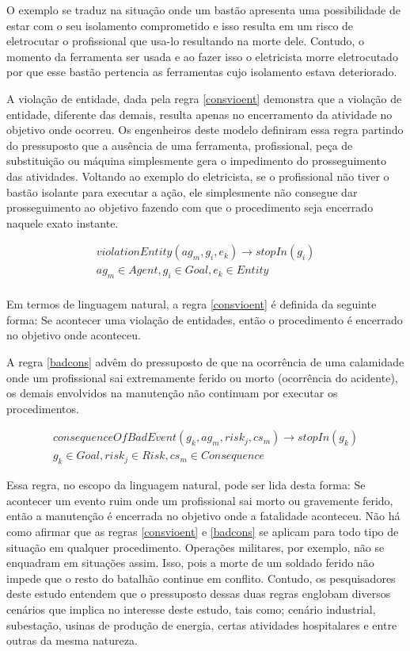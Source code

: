 O exemplo se traduz na situação onde um bastão apresenta uma possibilidade de estar com o seu isolamento comprometido e isso resulta em um risco de eletrocutar o profissional que usa-lo resultando na morte dele. Contudo, o momento da ferramenta ser usada e ao fazer isso o eletricista morre eletrocutado por que esse bastão pertencia as ferramentas cujo isolamento estava deteriorado. 

A violação de entidade, dada pela regra \ref{consvioent} demonstra que a violação de entidade, diferente das demais, resulta apenas no encerramento da atividade no objetivo onde ocorreu. Os engenheiros deste modelo definiram essa regra partindo do pressuposto que a ausência de uma ferramenta, profissional, peça de substituição ou máquina simplesmente gera o impedimento do prosseguimento das atividades. Voltando ao exemplo do eletricista, se o profissional não tiver o bastão isolante para executar a ação, ele simplesmente não consegue dar prosseguimento ao objetivo fazendo com que o procedimento seja encerrado naquele exato instante. 

\begin{eqnarray}\label{consvioent}
	violationEntity(ag_m,g_i,e_k) \to stopIn(g_i) \nonumber \\  
    ag_m \in Agent, g_i \in Goal, e_k \in Entity \\ \nonumber
\end{eqnarray}

Em termos de linguagem natural, a regra \ref{consvioent} é definida da seguinte forma: Se acontecer uma violação de entidades, então o procedimento é encerrado no objetivo onde aconteceu. 

A regra \ref{badcons} advêm do pressuposto de que na ocorrência de uma calamidade onde um profissional sai extremamente ferido ou morto (ocorrência do acidente), os demais envolvidos na manutenção não continuam por executar os procedimentos. 
 
 \begin{eqnarray}\label{badcons}
	consequenceOfBadEvent(g_k,ag_m,risk_j,cs_m) \to stopIn(g_k) \nonumber \\ 
    g_k \in Goal, risk_j \in Risk, cs_m \in Consequence
\end{eqnarray}

Essa regra, no escopo da linguagem natural, pode ser lida desta forma: Se acontecer um evento ruim onde um profissional sai morto ou gravemente ferido, então a manutenção é encerrada no objetivo onde a fatalidade aconteceu. Não há como afirmar que as regras  \ref{consvioent} e \ref{badcons} se aplicam para todo tipo de situação em qualquer procedimento. Operações militares, por exemplo, não se enquadram em situações assim. Isso, pois a morte de um soldado ferido não impede que o resto do batalhão continue em conflito. Contudo, os pesquisadores deste estudo entendem que o pressuposto dessas duas regras englobam diversos cenários que implica no interesse deste estudo, tais como; cenário industrial, subestação, usinas de produção de energia, certas atividades hospitalares e entre outras da mesma natureza.  

